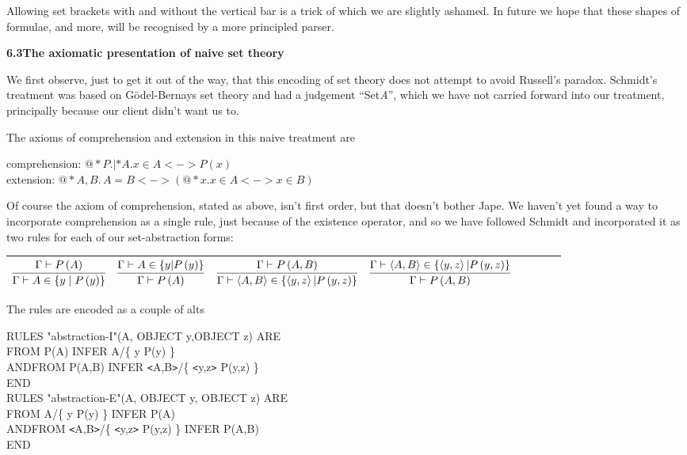 \documentclass[11pt]{book}
\newcommand{\tab}{\hspace{5mm}}
\begin{document}
Allowing set brackets with and without the vertical bar is a trick of which we are slightly ashamed. In future we hope that these shapes of formulae, and more, will be recognised by a more principled parser.


\textbf{6.3\tab The axiomatic presentation of naive set theory}


We first observe, just to get it out of the way, that this encoding of set theory does not attempt to avoid Russell's paradox. Schmidt's treatment was based on G\"{o}del-Bernays set theory and had a judgement ``Set{\nobreakspace}\textit{A}'', which we have not carried forward into our treatment, principally because our client didn't want us to.


The axioms of comprehension and extension in this naive treatment are


comprehension: $@*P.|*A.x\in A<->P(x)$ \\
extension: $@*A,B.\,A=B<->(@*x.x\in A<->x\in B)$



Of course the axiom of comprehension, stated as above, isn't first order, but that doesn't bother Jape. We haven't yet found a way to incorporate comprehension as a single rule, just because of the existence operator, and so we have followed Schmidt and incorporated it as two rules for each of our set-abstraction forms:\\


\begin{tabular}{|p{0.886in}|p{0.912in}|p{1.249in}|p{1.276in}|p{0.044in}|p{0.044in}|p{0.044in}|p{0.044in}|} \hline
{\raggedright $\infer
       {\Gamma  |- A\in \left\{ y \mid P\left( y\right) \right\} }
       {\Gamma  |- P\left( A\right) }$ } & 
{\raggedright $\infer
       {\Gamma |- P\left( A\right) }
       {\Gamma  |- A\in \left\{ y|P\left( y\right) \right\} } $ } & 
{\raggedright $\infer
       {\Gamma  |- \left\langle A,B\right\rangle \in \left\{ \left\langle y,z\right\rangle |P\left( y,z\right) \right\} }
       {\Gamma  |- P\left( A,B\right) }$ } & 
{\raggedright $\infer
       {\Gamma  |- P\left( A,B\right) }
       {\Gamma  |- \left\langle A,B\right\rangle \in \left\{ \left\langle y,z\right\rangle |P\left( y,z\right) \right\} }$ }\\
\hline \end{tabular}


The rules are encoded as a couple of alts

RULES "abstraction-I"(A, OBJECT y,OBJECT z) ARE \\
\tab FROM P(A) INFER A/\{ y {\textbar} P(y) \}\\
AND\tab FROM P(A,B) INFER \texttt{<}A,B\texttt{>}/\{ \texttt{<}y,z\texttt{>} {\textbar} P(y,z) \}\\
END\\
RULES "abstraction-E"(A, OBJECT y, OBJECT z) ARE\\
\tab FROM A/\{ y {\textbar} P(y) \} INFER P(A) \\
AND\tab FROM \texttt{<}A,B\texttt{>}/\{ \texttt{<}y,z\texttt{>} {\textbar} P(y,z) \} INFER P(A,B)\\
END
\end{document}
